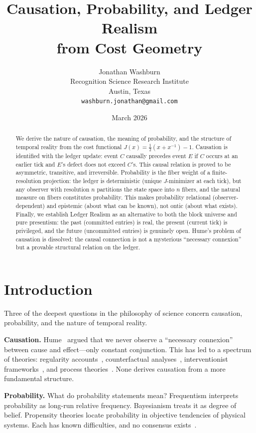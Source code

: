 \documentclass[12pt,a4paper]{article}
\title{Causation, Probability, and Ledger Realism\\
from Cost Geometry}
\author{Jonathan Washburn\\
Recognition Science Research Institute\\
Austin, Texas\\
\texttt{washburn.jonathan@gmail.com}}
\date{March 2026}
\theoremstyle{definition}
\theoremstyle{remark}
\begin{document}
\maketitle

\begin{abstract}
We derive the nature of causation, the meaning of probability, and
the structure of temporal reality from the cost functional
$J(x) = \tfrac{1}{2}(x + x^{-1}) - 1$.  Causation is identified with
the ledger update: event $C$ causally precedes event $E$ if $C$ occurs
at an earlier tick and $E$'s defect does not exceed $C$'s.  This causal
relation is proved to be asymmetric, transitive, and irreversible.
Probability is the fiber weight of a finite-resolution projection:
the ledger is deterministic (unique $J$-minimizer at each tick), but any
observer with resolution $n$ partitions the state space into $n$ fibers,
and the natural measure on fibers constitutes probability.  This makes
probability relational (observer-dependent) and epistemic (about what
can be known), not ontic (about what exists).  Finally, we establish
Ledger Realism as an alternative to both the block universe and pure
presentism: the past (committed entries) is real, the present (current
tick) is privileged, and the future (uncommitted entries) is genuinely
open.  Hume's problem of causation is dissolved: the causal connection
is not a mysterious ``necessary connexion'' but a provable structural
relation on the ledger.  \end{abstract}

\section{Introduction}
\label{sec:intro}

Three of the deepest questions in the philosophy of science concern
causation, probability, and the nature of temporal reality.

\textbf{Causation.}  Hume~\cite{Hume1748} argued that we never observe
a ``necessary connexion'' between cause and effect---only constant
conjunction.  This has led to a spectrum of theories: regularity
accounts~\cite{Hume1748}, counterfactual analyses~\cite{Lewis1973},
interventionist frameworks~\cite{Woodward2003}, and process
theories~\cite{Salmon1984}.  None derives causation from a more
fundamental structure.

\textbf{Probability.}  What do probability statements mean?  Frequentism
interprets probability as long-run relative frequency.  Bayesianism
treats it as degree of belief.  Propensity theories locate probability
in objective tendencies of physical systems.  Each has known
difficulties, and no consensus exists~\cite{Hajek2012}.
\end{document}
